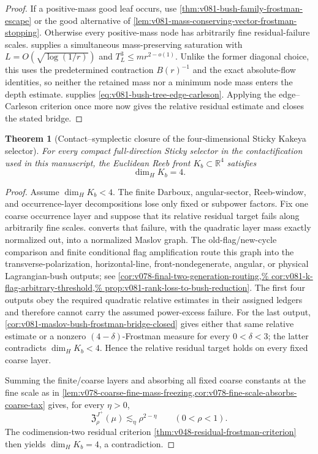 \documentclass[10pt]{article}
\newtheorem{theorem}{Theorem}[section]
\begin{document}
\begin{proof}
If a positive-mass good leaf occurs, use
\cref{thm:v081-bush-family-frostman-escape} or the good alternative of
\cref{lem:v081-mass-conserving-vector-frostman-stopping}.  Otherwise every positive-mass node has
arbitrarily fine residual-failure scales.   supplies a simultaneous mass-preserving saturation with
\(L=O(\sqrt{\log(1/r)})\) and \(T_L^3\le mr^{2-o(1)}\).  Unlike the former diagonal choice, this
uses the predetermined contraction \(B(r)^{-1}\) and the exact absolute-flow identities, so neither
the retained mass nor a minimum node mass enters the depth estimate.
 supplies
\eqref{eq:v081-bush-tree-edge-carleson}.  Applying the edge--Carleson criterion once more now
gives the relative residual estimate and closes the stated bridge.
\end{proof}

\begin{theorem}[Contact--symplectic closure of the four-dimensional Sticky Kakeya selector]
\label{thm:v081-sticky-kakeya-closure}
For every compact full-direction Sticky selector in the contactification used in this manuscript,
the Euclidean Reeb front \(K_b\subset\mathbb R^4\) satisfies
\[
\boxed{\dim_HK_b=4.}
\]
\end{theorem}

\begin{proof}
Assume \(\dim_HK_b<4\).  The finite Darboux, angular-sector, Reeb-window, and occurrence-layer
decompositions lose only fixed or subpower factors.  Fix one coarse occurrence layer and suppose
that its relative residual target fails along arbitrarily fine scales.
 converts that failure, with the quadratic layer
mass exactly normalized out, into a normalized Maslov graph.  The old-flag/new-cycle comparison
and finite conditional flag amplification route this graph into the transverse-polarization,
horizontal-line, front-nondegenerate, angular, or physical Lagrangian-bush outputs; see
\cref{cor:v078-final-two-generation-routing,%
cor:v081-k-flag-arbitrary-threshold,%
prop:v081-rank-loss-to-bush-reduction}.  The first four outputs obey the required quadratic
relative estimates in their assigned ledgers and therefore cannot carry the assumed power-excess
failure.  For the last output,
\cref{cor:v081-maslov-bush-frostman-bridge-closed} gives either that same relative estimate or a
nonzero \((4-\delta)\)-Frostman measure for every \(0<\delta<3\); the latter contradicts
\(\dim_HK_b<4\).  Hence the relative residual target holds on every fixed coarse layer.

Summing the finite/coarse layers and absorbing all fixed coarse constants at the fine scale as in
\cref{lem:v078-coarse-fine-mass-freezing,cor:v078-fine-scale-absorbs-coarse-tax} gives, for every
\(\eta>0\),
\[
\mathfrak Z_\rho^{J^+}(\mu)
\lesssim_\eta
\rho^{2-\eta}
\qquad(0<\rho<1).
\]
The codimension-two residual criterion
\cref{thm:v048-residual-frostman-criterion} then yields
\(\dim_HK_b=4\), a contradiction.
\end{proof}
\end{document}
